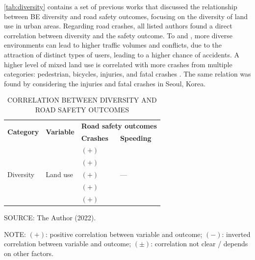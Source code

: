 \autoref{tab:diversity} contains a set of previous works that discussed the relationship between BE diversity and road safety outcomes, focusing on the diversity of land use in urban areas. Regarding road crashes, all listed authors found a direct correlation between diversity and the safety outcome. To \textcite{Obelheiro2020} and \textcite{Obelheiro2019}, more diverse environments can lead to higher traffic volumes and conflicts, due to the attraction of distinct types of users, leading to a higher chance of accidents. A higher level of mixed land use is correlated with more crashes from multiple categories: pedestrian, bicycles, injuries, and fatal crashes \cite{Ouyang2014}. The same relation was found by \textcite{Rhee2016} considering the injuries and fatal crashes in Seoul, Korea.

\begin{table}[!hbtp]
    \footnotesize
    \captionsetup{justification=raggedright,
        singlelinecheck=false,
        font=footnotesize}
    \caption{CORRELATION BETWEEN DIVERSITY AND ROAD SAFETY OUTCOMES}
    \centering
    \begin{tabular}{llll}
        \hline
        \multirow{2}{*}{\textbf{Category}} & \multirow{2}{*}{\textbf{Variable}} & \multicolumn{2}{c}{\textbf{Road safety outcomes}} \\
         &  & \textbf{Crashes} & \textbf{Speeding} \\ \hline
        \multirow{5}{*}{Diversity} & \multirow{5}{*}{Land use} & $(+)$ \textcite{Amoh-Gyimah2017} & \multirow{5}{*}{---} \\
         &  & $(+)$ \textcite{Obelheiro2019} &  \\
         &  & $(+)$ \textcite{Obelheiro2020} &  \\
         &  & $(+)$ \textcite{Ouyang2014} &  \\
         &  & $(+)$ \textcite{Rhee2016} &  \\ \hline
    \end{tabular}
    \label{tab:diversity}
    \par \vspace{2mm} \footnotesize \raggedright
    SOURCE: The Author (2022).
    \par \vspace{1mm} \footnotesize \raggedright
    NOTE: $(+)$: positive correlation between variable and outcome; $(-)$: inverted correlation between variable and outcome; $(\pm)$: correlation not clear / depends on other factors.
\end{table}


